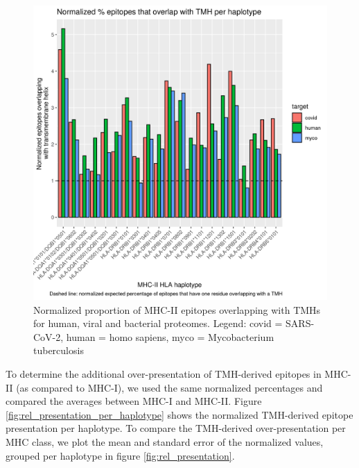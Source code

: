 \begin{figure}[!htbp]
  \includegraphics[width=\textwidth]{bbbq_1_smart_results/fig_f_tmh_mhc2_2_normalized.png}
  \caption{
    Normalized proportion of MHC-II epitopes overlapping with TMHs
    for human, viral and bacterial proteomes.
    Legend: covid = SARS-CoV-2,
    human = homo sapiens, myco = Mycobacterium tuberculosis
  }
  \label{fig:f_tmh_mhc2_normalized}
\end{figure}

To determine the additional over-presentation of TMH-derived epitopes 
in MHC-II (as compared to MHC-I), we used the same normalized percentages
and compared the averages between MHC-I and MHC-II.
Figure \ref{fig:rel_presentation_per_haplotype} shows the normalized
TMH-derived epitope presentation per haplotype.
To compare the TMH-derived over-presentation per MHC class, 
we plot the mean and standard error of the normalized values,
grouped per haplotype in figure \ref{fig:rel_presentation}.

